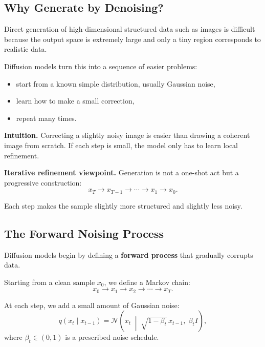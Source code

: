 \subsection{Why Generate by Denoising?}

Direct generation of high-dimensional structured data such as images is difficult because the output space is extremely large and only a tiny region corresponds to realistic data.

\medskip

\noindent
Diffusion models turn this into a sequence of easier problems:
\begin{itemize}
    \item start from a known simple distribution, usually Gaussian noise,
    \item learn how to make a small correction,
    \item repeat many times.
\end{itemize}

\medskip

\noindent
\textbf{Intuition.}
Correcting a slightly noisy image is easier than drawing a coherent image from scratch. If each step is small, the model only has to learn local refinement.

\medskip

\noindent
\textbf{Iterative refinement viewpoint.}
Generation is not a one-shot act but a progressive construction:
\[
x_T \to x_{T-1} \to \cdots \to x_1 \to x_0.
\]

\medskip

\noindent
Each step makes the sample slightly more structured and slightly less noisy.

\subsection{The Forward Noising Process}

Diffusion models begin by defining a \textbf{forward process} that gradually corrupts data.

\medskip

\noindent
Starting from a clean sample $x_0$, we define a Markov chain:
\[
x_0 \to x_1 \to x_2 \to \cdots \to x_T.
\]

At each step, we add a small amount of Gaussian noise:
\[
q(x_t \mid x_{t-1})
=
\mathcal{N}\!\left(
x_t \;\middle|\; \sqrt{1-\beta_t}\,x_{t-1},\; \beta_t I
\right),
\]
where $\beta_t \in (0,1)$ is a prescribed noise schedule.

\medskip

